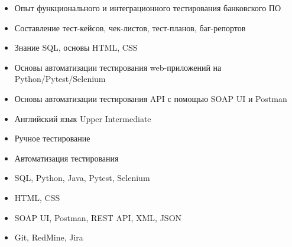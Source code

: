 \documentclass[10pt]{developercv} %
\begin{document}
\begin{minipage}[t]{0.6\textwidth}
	\vspace{-\baselineskip}
	\begin{itemize}
		\setlength\itemsep{0pt}
		\setlength\itemindent{-\baselineskip}
		\item{Опыт функционального и интеграционного тестирования банковского ПО}
		\item{Составление тест-кейсов, чек-листов, тест-планов, баг-репортов}
		\item{Знание SQL, основы HTML, CSS}
		\item{Основы автоматизации тестирования web-приложений на Python/Pytest/Selenium}
		\item{Основы автоматизации тестирования API с помощью SOAP UI и Postman}
		\item{Английский язык Upper Intermediate}
	\end{itemize}
\end{minipage}
\hfill %
\begin{minipage}[t]{0.35\textwidth}
	\vspace{-\baselineskip}
	\begin{itemize}
		\setlength\itemsep{0pt}
		\setlength\itemindent{-\baselineskip}
		\item{Ручное тестирование}
		\item{Автоматизация тестирования}
		\item{SQL, Python, Java, Pytest, Selenium}
		\item{HTML, CSS}
		\item{SOAP UI, Postman, REST API, XML, JSON}
		\item{Git, RedMine, Jira}
	\end{itemize}
\end{minipage}



\end{document}
